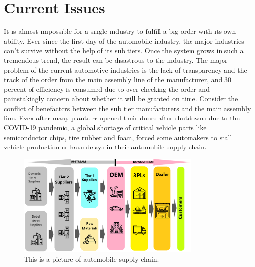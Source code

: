 \documentclass[12pt]{article}
\begin{document}
\section{Current Issues} \label{issues}
It is almost impossible for a single industry to fulfill a big order with its own ability. Ever since the first day of the automobile industry, the major industries can't survive without the help of its sub tiers. Once the system grows in such a tremendous trend, the result can be disastrous to the industry.\cite{edi} The major problem of the current automotive industries is the lack of transparency and the track of the order from the main assembly line of the manufacturer, and 30 percent of efficiency is consumed due to over checking the order and painstakingly concern about whether it will be granted on time. Consider the conflict of benefactors between the sub tier manufacturers and the main assembly line. Even after many plants re-opened their doors after shutdowns due to the COVID-19 pandemic, a global shortage of critical vehicle parts like semiconductor chips, tire rubber and foam, forced some automakers to stall vehicle production or have delays in their automobile supply chain. 
\begin{figure}
\centering
\includegraphics[width=0.8\textwidth]{tiers.png}
\caption{\label{fig:tiers}This is a picture of automobile supply chain.}
\end{figure}
\end{document}
